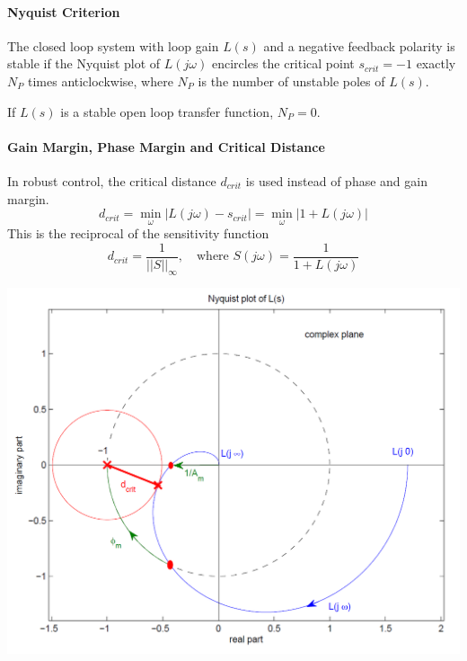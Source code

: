 \begin{minipage}{10cm}
    \paragraph{Nyquist Criterion}The closed loop system with loop gain $L(s)$ and a negative feedback polarity
    is stable if the Nyquist plot of $L(j\omega)$ encircles the critical point $s_{crit}=-1$ exactly
    $N_P$ times anticlockwise, where $N_P$ is the number of unstable poles of $L(s)$.
    
    If $L(s)$ is a stable open loop transfer function, $N_P = 0$.

    \paragraph{Gain Margin, Phase Margin and Critical Distance}
    In robust control, the critical distance $d_{crit}$ is used instead
    of phase and gain margin. 
    \[
        d_{crit} = \min_{\omega} |L(j\omega) - s_{crit}| = \min_{\omega}|1+L(j\omega)|
    \]
    This is the reciprocal of the sensitivity function
    \[
        d_{crit} = \frac{1}{||S||_{\infty}}, \quad \text{where } S(j\omega) = \frac{1}{1 + L(j\omega)}
    \]
\end{minipage}
\hspace{0.5cm}
\begin{minipage}{8cm}
    \centering
    \includegraphics[width=\linewidth]{bilder/robust_nyquist.png}
\end{minipage}

